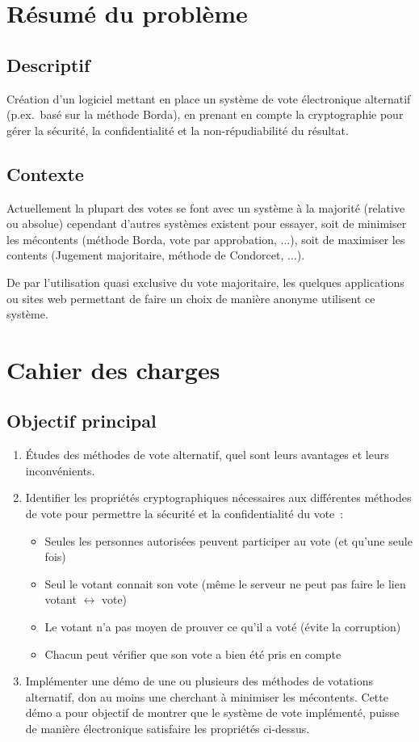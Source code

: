 \documentclass[../report]{subfiles}
\begin{document}
\section{Résumé du problème}
\subsection{Descriptif}
Création d'un logiciel mettant en place un système de vote électronique alternatif (p.ex.~basé sur la méthode Borda), en prenant en compte la cryptographie pour gérer la sécurité, la confidentialité et la non-répudiabilité du résultat.

\subsection{Contexte}
Actuellement la plupart des votes se font avec un système à la majorité (relative ou absolue) cependant d'autres systèmes existent pour essayer, soit de minimiser les mécontents (méthode Borda, vote par approbation, ...), soit de maximiser les contents (Jugement majoritaire, méthode de Condorcet, ...).

De par l'utilisation quasi exclusive du vote majoritaire, les quelques applications ou sites web permettant de faire un choix de manière anonyme utilisent ce système.

\section{Cahier des charges}
\subsection{Objectif principal}
\begin{enumerate}
  \item Études des méthodes de vote alternatif, quel sont leurs avantages et leurs inconvénients.
  \item Identifier les propriétés cryptographiques nécessaires aux différentes méthodes de vote pour permettre la sécurité et la confidentialité du vote~:
    \begin{itemize}
      \item Seules les personnes autorisées peuvent participer au vote (et qu'une seule fois)
      \item Seul le votant connait son vote (même le serveur ne peut pas faire le lien votant $\longleftrightarrow$ vote)
      \item Le votant n'a pas moyen de prouver ce qu'il a voté (évite la corruption)
      \item Chacun peut vérifier que son vote a bien été pris en compte
    \end{itemize}
  \item Implémenter une démo de une ou plusieurs des méthodes de votations alternatif, don au moins une cherchant à minimiser les mécontents. Cette démo a pour objectif de montrer que le système de vote implémenté, puisse de manière électronique satisfaire les propriétés ci-dessus.
\end{enumerate}
\end{document}
